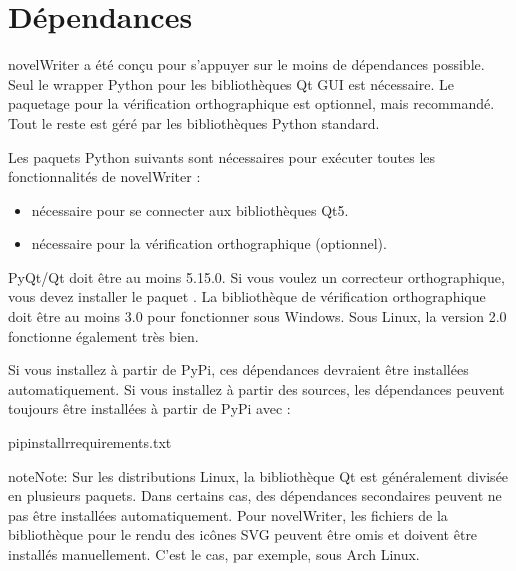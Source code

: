 \documentclass[a4paper,11pt,french]{sphinxmanual}
\begin{document}
\section{Dépendances}
\label{\detokenize{tech_source:dependencies}}\label{\detokenize{tech_source:a-source-depend}}
\sphinxAtStartPar
novelWriter a été conçu pour s’appuyer sur le moins de dépendances possible. Seul le wrapper Python pour les bibliothèques Qt GUI est nécessaire. Le paquetage pour la vérification orthographique est optionnel, mais recommandé. Tout le reste est géré par les bibliothèques Python standard.

\sphinxAtStartPar
Les paquets Python suivants sont nécessaires pour exécuter toutes les fonctionnalités de novelWriter :
\begin{itemize}
\item {} 
\sphinxAtStartPar
{} \sphinxhyphen{} nécessaire pour se connecter aux bibliothèques Qt5.

\item {} 
\sphinxAtStartPar
{} \sphinxhyphen{} nécessaire pour la vérification orthographique (optionnel).

\end{itemize}

\sphinxAtStartPar
PyQt/Qt doit être au moins 5.15.0. Si vous voulez un correcteur orthographique, vous devez installer le paquet . La bibliothèque de vérification orthographique doit être au moins 3.0 pour fonctionner sous Windows. Sous Linux, la version 2.0 fonctionne également très bien.

\sphinxAtStartPar
Si vous installez à partir de PyPi, ces dépendances devraient être installées automatiquement. Si vous installez à partir des sources, les dépendances peuvent toujours être installées à partir de PyPi avec :

\begin{sphinxVerbatim}[commandchars=\\\{\}]
pipinstall\PYGZhy{}rrequirements.txt
\end{sphinxVerbatim}

\begin{sphinxadmonition}{note}{Note:}
\sphinxAtStartPar
Sur les distributions Linux, la bibliothèque Qt est généralement divisée en plusieurs paquets. Dans certains cas, des dépendances secondaires peuvent ne pas être installées automatiquement. Pour novelWriter, les fichiers de la bibliothèque pour le rendu des icônes SVG peuvent être omis et doivent être installés manuellement. C’est le cas, par exemple, sous Arch Linux.
\end{sphinxadmonition}
\end{document}
